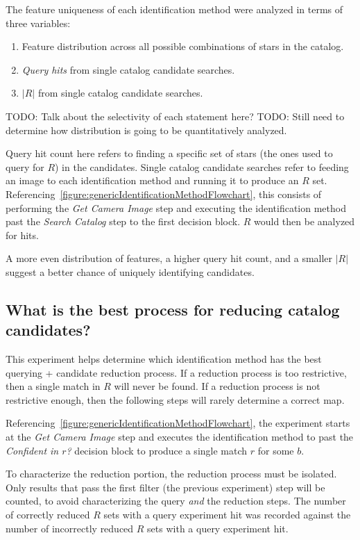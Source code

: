 The feature uniqueness of each identification method were analyzed in terms of three variables:
\begin{enumerate}
    \item \label{itm:featureDist} Feature distribution across all possible combinations of stars in the catalog.
    \item \label{itm:hitCountFeature} \textit{Query hits} from single catalog candidate searches.
    \item $|R|$ from single catalog candidate searches.
\end{enumerate}

TODO: Talk about the selectivity of each statement here?
TODO: Still need to determine how distribution is going to be quantitatively analyzed.

Query hit count here refers to finding a specific set of stars (the ones used to query for $R$) in the candidates.
Single catalog candidate searches refer to feeding an image to each identification method and running it to produce
an $R$ set.
Referencing~\autoref{figure:genericIdentificationMethodFlowchart}, this consists of performing the \textit{Get Camera
Image} step and executing the identification method past the \textit{Search Catalog} step to the first decision
block.
$R$ would then be analyzed for hits.

A more even distribution of features, a higher query hit count, and a smaller $|R|$ suggest a better chance of uniquely
identifying candidates.

\subsection{What is the best process for reducing catalog candidates?}\label{subsec:candidateReductionMethods}
This experiment helps determine which identification method has the best querying + candidate reduction process.
If a reduction process is too restrictive, then a single match in $R$ will never be found.
If a reduction process is not restrictive enough, then the following steps will rarely determine a correct map.

Referencing~\autoref{figure:genericIdentificationMethodFlowchart}, the experiment starts at the \textit{Get Camera
Image} step and executes the identification method to past the \textit{Confident in $r$?} decision block to produce a
single match $r$ for some $b$.

To characterize the reduction portion, the reduction process must be isolated.
Only results that pass the first filter (the previous experiment) step will be counted, to avoid characterizing the
query \textit{and} the reduction steps.
The number of correctly reduced $R$ sets with a query experiment hit was recorded against the number of incorrectly
reduced $R$ sets with a query experiment hit.


